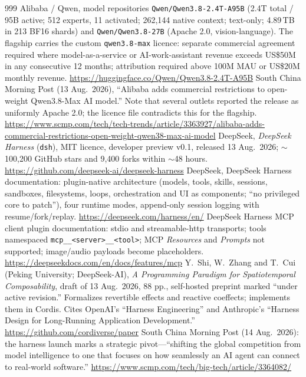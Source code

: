 \begin{thebibliography}{999}
 Alibaba / Qwen, model repositories \texttt{Qwen/Qwen3.8-2.4T-A95B} (2.4T total / 95B active; 512 experts, 11 activated; 262,144 native context; text-only; 4.89\,TB in 213 BF16 shards) and \texttt{Qwen/Qwen3.8-27B} (Apache 2.0, vision-language). The flagship carries the custom \texttt{qwen3.8-max} licence: separate commercial agreement required where model-as-a-service or AI-work-assistant revenue exceeds US\$50M in any consecutive 12 months; attribution required above 100M MAU or US\$20M monthly revenue. \url{https://huggingface.co/Qwen/Qwen3.8-2.4T-A95B}
 South China Morning Post (13 Aug.\ 2026), ``Alibaba adds commercial restrictions to open-weight Qwen3.8-Max AI model.'' Note that several outlets reported the release as uniformly Apache 2.0; the licence file contradicts this for the flagship. \url{https://www.scmp.com/tech/tech-trends/article/3363927/alibaba-adds-commercial-restrictions-open-weight-qwen38-max-ai-model}
 DeepSeek, \emph{DeepSeek Harness} (\texttt{dsh}), MIT licence, developer preview v0.1, released 13 Aug.\ 2026; $\sim$100,200 GitHub stars and 9,400 forks within $\sim$48 hours. \url{https://github.com/deepseek-ai/deepseek-harness}
 DeepSeek, DeepSeek Harness documentation: plugin-native architecture (models, tools, skills, sessions, sandboxes, filesystems, loops, orchestration and UI as components; ``no privileged core to patch''), four runtime modes, append-only session logging with resume/fork/replay. \url{https://deepseek.com/harness/en/}
 DeepSeek Harness MCP client plugin documentation: stdio and streamable-http transports; tools namespaced \texttt{mcp\_\_<server>\_\_<tool>}; MCP \emph{Resources} and \emph{Prompts} not supported; image/audio payloads become placeholders. \url{https://deepseekdocs.com/en/docs/features/mcp}
 Y.~Shi, W.~Zhang and T.~Cui (Peking University; DeepSeek-AI), \emph{A Programming Paradigm for Spatiotemporal Composability}, draft of 13 Aug.\ 2026, 88 pp., self-hosted preprint marked ``under active revision.'' Formalizes revertible effects and reactive coeffects; implements them in Cordis. Cites OpenAI's ``Harness Engineering'' and Anthropic's ``Harness Design for Long-Running Application Development.'' \url{https://github.com/cordiverse/paper}
 South China Morning Post (14 Aug.\ 2026): the harness launch marks a strategic pivot---``shifting the global competition from model intelligence to one that focuses on how seamlessly an AI agent can connect to real-world software.'' \url{https://www.scmp.com/tech/big-tech/article/3364082/}

\end{thebibliography}
